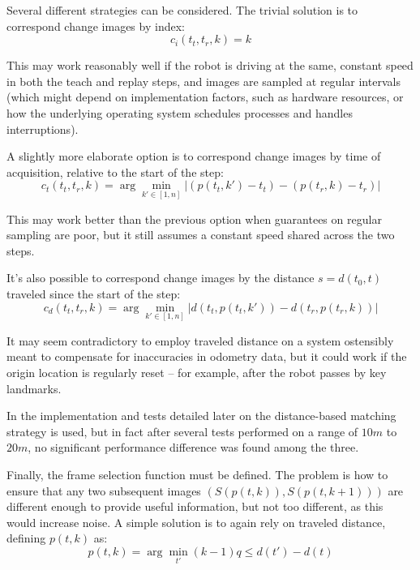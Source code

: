 \documentclass[twocolumn, 9pt,fleqn]{jsproceedings}
\begin{document}
Several different strategies can be considered. The trivial solution is to correspond change images by index:
\begin{equation}
c_i(t_t, t_r, k) = k
\end{equation}

This may work reasonably well if the robot is driving at the same, constant speed in both the teach and replay steps, and images are sampled at regular intervals (which might depend on implementation factors, such as hardware resources, or how the underlying operating system schedules processes and handles interruptions).

A slightly more elaborate option is to correspond change images by time of acquisition, relative to the start of the step:
\begin{equation}
c_t(t_t, t_r, k) = \arg \min_{k' \in [1, n]} {| (p(t_t, k') - t_t) - (p(t_r, k) - t_r) |}
\end{equation}

This may work better than the previous option when guarantees on regular sampling are poor, but it still assumes a constant speed shared across the two steps.

It's also possible to correspond change images by the distance $s = d(t_0, t)$ traveled since the start of the step:
\begin{equation}
c_d(t_t, t_r, k) = \arg \min_{k' \in [1, n]} {| d(t_t, p(t_t, k')) - d(t_r, p(t_r, k)) |}
\end{equation}

It may seem contradictory to employ traveled distance on a system ostensibly meant to compensate for inaccuracies in odometry data, but it could work if the origin location is regularly reset -- for example, after the robot passes by key landmarks.

In the implementation and tests detailed later on the distance-based matching strategy is used, but in fact after several tests performed on a range of $10m$ to $20m$, no significant performance difference was found among the three.

Finally, the frame selection function must be defined. The problem is how to ensure that any two subsequent images $(S(p(t, k)), S(p(t, k+1)))$ are different enough to provide useful information, but not too different, as this would increase noise. A simple solution is to again rely on traveled distance, defining  $p(t, k)$ as:
\begin{equation}
p(t, k) = \arg \min_{t'} {(k - 1)q \leq d(t') - d(t)}
\end{equation}
\end{document}
